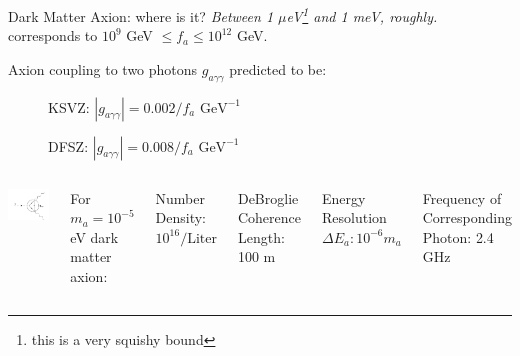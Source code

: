 \documentclass{beamer}
\begin{document}
\begin{frame}{Dark Matter Axion: where is it?}
\textit{Between 1 $\mu$eV\footnote{this is a very squishy bound} and 1 meV, roughly.}\\
{\tiny {\color{blue} corresponds to $10^9$ GeV $\leq f_a \leq 10^{12}$ GeV.}}\medskip

Axion coupling to two photons $g_{a\gamma\gamma}$ predicted to be:
\begin{description}
\item[ ] KSVZ:  $|g_{a\gamma\gamma}| = 0.002 / f_a$ $\text{GeV}^{-1}$
\item[ ] DFSZ: $|g_{a\gamma\gamma}| = 0.008 / f_a$ $\text{GeV}^{-1}$
\end{description}
\begin{columns}
\includegraphics[width=\textwidth]{axion_photon_feynman_diagram}

{\tiny For $m_a =10^{-5}$ eV dark matter axion:}

{\tiny Number Density: {\color{red} $10^{16}/\text{Liter}$}}

{\tiny DeBroglie Coherence Length: {\color{red} 100 m}}

{\tiny Energy Resolution $\Delta E_a:  10^{-6}m_a$ }

{\tiny Frequency of Corresponding Photon: {\color{blue} 2.4 GHz }}
\end{columns}
\end{frame}
\end{document}
